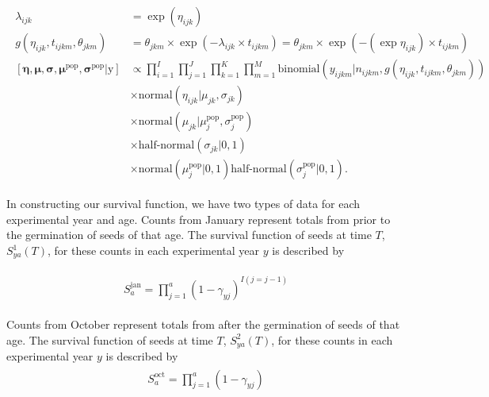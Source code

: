 \documentclass[12pt, oneside, titlepage]{article}   	%
\begin{document}
\begin{align}
  \begin{split}
  \lambda_{ijk} & = \exp(\eta_{ijk})
 \\ g( \eta_{ijk}, t_{ijkm}, \theta_{jkm} ) & = \theta_{jkm}  \times \exp(-\lambda_{ijk} \times t_{ijkm}) = \theta_{jkm}  \times \exp(-(\exp{\eta_{ijk}}) \times t_{ijkm}) 
 \\ [  \bm{\eta} , \bm{\mu} , \bm{\sigma} , \bm{\mu}^\mathrm{pop}, \bm{\sigma}^\mathrm{pop} |  \bm{\mathrm{y}}  ] &  \propto \prod_{i=1}^{I}  \prod_{j=1}^{J} \prod_{k=1}^{K} \prod_{m=1}^{M} 
   \mathrm{binomial} ( y_{ijkm} | n_{ijkm}, g( \eta_{ijk}, t_{ijkm}, \theta_{jkm} ) ) 
   \\ & \times \mathrm{normal} ( \eta_{ijk}  | \mu_{jk}, \sigma{_{jk} })
  \\ & \times \mathrm{normal} ( \mu_{jk}  | \mu^\mathrm{pop}_{j}, \sigma^\mathrm{pop}_{j} )
  \\ & \times \textrm{half-normal} ( \sigma_{jk} | 0,1)
  \\ & \times \mathrm{normal} ( \mu^\mathrm{pop}_{j} | 0 , 1 ) \textrm{half-normal} ( \sigma^\mathrm{pop}_{j} | 0,1).
  \end{split}
\end{align}


In constructing our survival function, we have two types of data for each experimental year and age. Counts from January represent totals from prior to the germination of seeds of that age. The survival function of seeds at time $T$, $S^1_{ya}(T)$, for these counts in each experimental year $y$ is described by 
%
%

\begin{align}
  \begin{split}
S^\mathrm{jan}_{a} = \prod_{j=1}^{a} (1- \gamma_{yj} )^{I(j=j-1)}
  \end{split}
\end{align}

Counts from October represent totals from after  the germination of seeds of that age. The survival function of seeds at time $T$, $S^2_{ya}(T)$, for these counts in each experimental year $y$ is described by
%
\begin{align}
  \begin{split}
S^\mathrm{oct}_{a} = \prod_{j=1}^{a} (1- \gamma_{yj} )
  \end{split}
\end{align}
%
\end{document}
